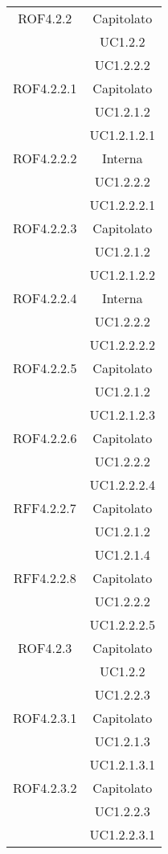 \begin{longtable}{|c|c|}
\midrule
ROF4.2.2
& Capitolato\\
& UC1.2.2\\
& UC1.2.2.2\\

\midrule
ROF4.2.2.1
& Capitolato\\
& UC1.2.1.2\\
& UC1.2.1.2.1\\

\midrule
ROF4.2.2.2
& Interna\\
& UC1.2.2.2\\
& UC1.2.2.2.1\\

\midrule
ROF4.2.2.3
& Capitolato\\
& UC1.2.1.2\\
& UC1.2.1.2.2\\

\midrule
ROF4.2.2.4
& Interna\\
& UC1.2.2.2\\
& UC1.2.2.2.2\\

\midrule
ROF4.2.2.5
& Capitolato\\
& UC1.2.1.2\\
& UC1.2.1.2.3\\

\midrule
ROF4.2.2.6
& Capitolato\\
& UC1.2.2.2\\
& UC1.2.2.2.4\\

\midrule
RFF4.2.2.7
& Capitolato\\
& UC1.2.1.2\\
& UC1.2.1.4\\

\midrule
RFF4.2.2.8
& Capitolato\\
& UC1.2.2.2\\
& UC1.2.2.2.5\\

\midrule
ROF4.2.3
& Capitolato\\
& UC1.2.2\\
& UC1.2.2.3\\

\midrule
ROF4.2.3.1
& Capitolato\\
& UC1.2.1.3\\
& UC1.2.1.3.1\\

\midrule
ROF4.2.3.2
& Capitolato\\
& UC1.2.2.3\\
& UC1.2.2.3.1\\


\end{longtable}
